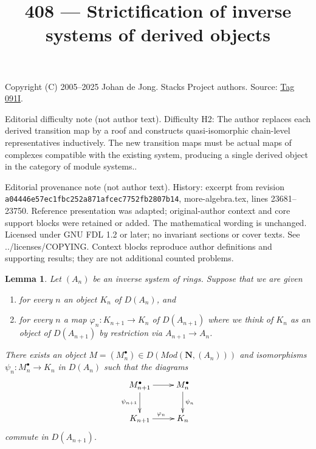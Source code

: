 \documentclass{amsart}
\theoremstyle{plain}
\newtheorem{lemma}[subsection]{Lemma}
\theoremstyle{definition}
\theoremstyle{remark}
\numberwithin{equation}{subsection}
\begin{document}
\title[Stacks Project, Tag 091I]{408 --- Strictification of inverse systems of derived objects}
\maketitle
\noindent Copyright (C) 2005--2025 Johan de Jong. Stacks Project authors. Source: \href{https://stacks.math.columbia.edu/tag/091I}{Tag 091I}.

\noindent Editorial difficulty note (not author text). Difficulty H2: The author replaces each derived transition map by a roof and constructs quasi-isomorphic chain-level representatives inductively. The new transition maps must be actual maps of complexes compatible with the existing system, producing a single derived object in the category of module systems..

\noindent Editorial provenance note (not author text). History: excerpt from revision \texttt{a0444\allowbreak 6e57e\allowbreak c1fbc\allowbreak 252a8\allowbreak 71afc\allowbreak ec775\allowbreak 2fb28\allowbreak 07b14}, more-algebra.tex, lines 23681--23750. Reference presentation was adapted; original-author context and core support blocks were retained or added. The mathematical wording is unchanged. Licensed under GNU FDL 1.2 or later; no invariant sections or cover texts. See ../licenses/COPYING. Context blocks reproduce author definitions and supporting results; they are not additional counted problems.

\begin{lemma}
\label{lemma-lift-to-system-complexes}
Let $(A_n)$ be an inverse system of rings. Suppose that we are given
\begin{enumerate}
\item for every $n$ an object $K_n$ of $D(A_n)$, and
\item for every $n$ a map $\varphi_n : K_{n + 1} \to K_n$ of
$D(A_{n + 1})$ where we think of $K_n$ as an object of $D(A_{n + 1})$
by restriction via $A_{n + 1} \to A_n$.
\end{enumerate}
There exists an object
$M = (M_n^\bullet) \in D(\textit{Mod}(\mathbf{N}, (A_n)))$
and isomorphisms $\psi_n : M_n^\bullet \to K_n$ in $D(A_n)$
such that the diagrams
$$
\xymatrix{
M_{n + 1}^\bullet \ar[d]_{\psi_{n + 1}} \ar[r] & M_n^\bullet \ar[d]^{\psi_n} \\
K_{n + 1} \ar[r]^{\varphi_n} & K_n
}
$$
commute in $D(A_{n + 1})$.
\end{lemma}
\end{document}
